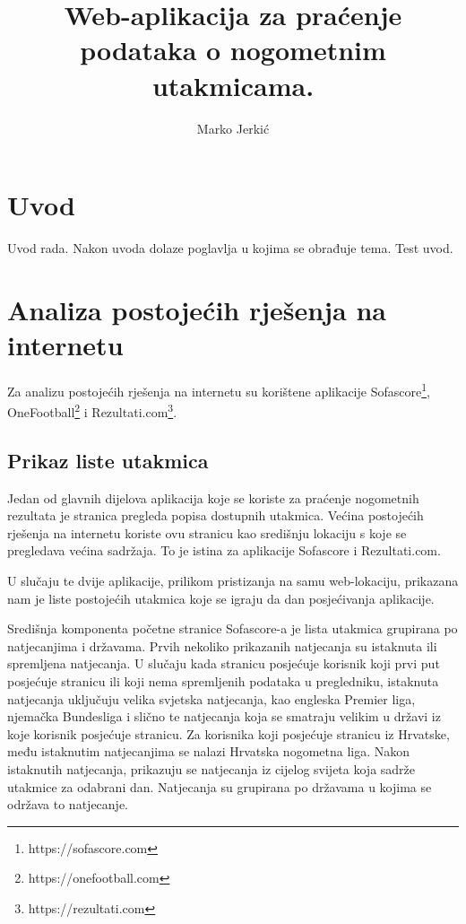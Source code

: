 \documentclass[times, utf8, zavrsni]{fer}
\begin{document}

\title{Web-aplikacija za praćenje podataka o nogometnim utakmicama.}

\author{Marko Jerkić}

\maketitle


\zahvala{}

\tableofcontents

\chapter{Uvod}
Uvod rada. Nakon uvoda dolaze poglavlja u kojima se obrađuje tema.
Test uvod.

\chapter{Analiza postojećih rješenja na internetu}
Za analizu postojećih rješenja na internetu su korištene aplikacije Sofascore\footnote{https://sofascore.com}, OneFootball\footnote{https://onefootball.com} i Rezultati.com\footnote{https://rezultati.com}.

\section{Prikaz liste utakmica}

Jedan od glavnih dijelova aplikacija koje se koriste za praćenje nogometnih rezultata je stranica pregleda popisa dostupnih utakmica.
Većina postojećih rješenja na internetu koriste ovu stranicu kao središnju lokaciju s koje se pregledava većina sadržaja. To je istina za aplikacije Sofascore i Rezultati.com.

U slučaju te dvije aplikacije, prilikom pristizanja na samu web-lokaciju, prikazana nam je liste postojećih utakmica koje se igraju da dan posjećivanja aplikacije.

Središnja komponenta početne stranice Sofascore-a je lista utakmica grupirana po natjecanjima i državama. Prvih nekoliko prikazanih natjecanja su istaknuta ili spremljena natjecanja.
U slučaju kada stranicu posjećuje korisnik koji prvi put posjećuje stranicu ili koji nema spremljenih podataka u pregledniku, istaknuta natjecanja uključuju velika svjetska natjecanja,
kao engleska Premier liga, njemačka Bundesliga i slično te natjecanja koja se smatraju velikim u državi iz koje korisnik posjećuje stranicu.
Za korisnika koji posjećuje stranicu iz Hrvatske, među istaknutim natjecanjima se nalazi Hrvatska nogometna liga.
Nakon istaknutih natjecanja, prikazuju se natjecanja iz cijelog svijeta koja sadrže utakmice za odabrani dan. Natjecanja su grupirana po državama u kojima se održava to natjecanje.
\end{document}
